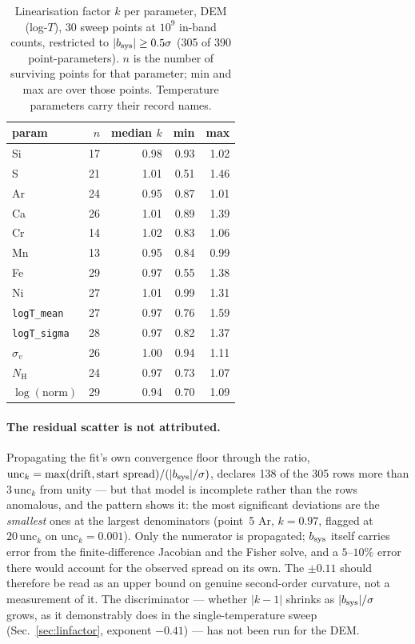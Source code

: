 \documentclass[11pt,a4paper]{article}
\newcommand{\nh}{N_{\mathrm{H}}}
\newcommand{\code}[1]{\texttt{#1}}
\begin{document}
\begin{table}[htbp]
\centering
\caption{Linearisation factor $k$ per parameter, DEM (log-$T$), 30 sweep points
at $10^9$ in-band counts, restricted to $|b_{\rm sys}|\ge0.5\sigma$ (305 of 390
point-parameters). $n$ is the number of surviving points for that parameter;
min and max are over those points. Temperature parameters carry their
record names.}
\label{tab:kdem}
\begin{tabular}{lrrrr}
\toprule
param & $n$ & median $k$ & min & max \\
\midrule
Si                  & 17 & 0.98 & 0.93 & 1.02 \\
S                   & 21 & 1.01 & 0.51 & 1.46 \\
Ar                  & 24 & 0.95 & 0.87 & 1.01 \\
Ca                  & 26 & 1.01 & 0.89 & 1.39 \\
Cr                  & 14 & 1.02 & 0.83 & 1.06 \\
Mn                  & 13 & 0.95 & 0.84 & 0.99 \\
Fe                  & 29 & 0.97 & 0.55 & 1.38 \\
Ni                  & 27 & 1.01 & 0.99 & 1.31 \\
\code{logT\_mean}   & 27 & 0.97 & 0.76 & 1.59 \\
\code{logT\_sigma}  & 28 & 0.97 & 0.82 & 1.37 \\
$\sigma_v$          & 26 & 1.00 & 0.94 & 1.11 \\
$\nh$               & 24 & 0.97 & 0.73 & 1.07 \\
$\log(\text{norm})$ & 29 & 0.94 & 0.70 & 1.09 \\
\bottomrule
\end{tabular}
\end{table}

\paragraph{The residual scatter is not attributed.} Propagating the fit's own
convergence floor through the ratio,
$\mathrm{unc}_k=\max(\text{drift},\text{start spread})/(|b_{\rm sys}|/\sigma)$,
declares 138 of the 305 rows more than $3\,\mathrm{unc}_k$ from unity --- but
that model is incomplete rather than the rows anomalous, and the pattern shows
it: the most significant deviations are the \emph{smallest} ones at the largest
denominators (point~5 Ar, $k=0.97$, flagged at $20\,\mathrm{unc}_k$ on
$\mathrm{unc}_k=0.001$). Only the numerator is propagated; $b_{\rm sys}$ itself
carries error from the finite-difference Jacobian and the Fisher solve, and a
$5$--$10\%$ error there would account for the observed spread on its own. The
$\pm0.11$ should therefore be read as an upper bound on genuine second-order
curvature, not a measurement of it. The discriminator --- whether $|k-1|$
shrinks as $|b_{\rm sys}|/\sigma$ grows, as it demonstrably does in the
single-temperature sweep (Sec.~\ref{sec:linfactor}, exponent $-0.41$) --- has
not been run for the DEM.
\end{document}

